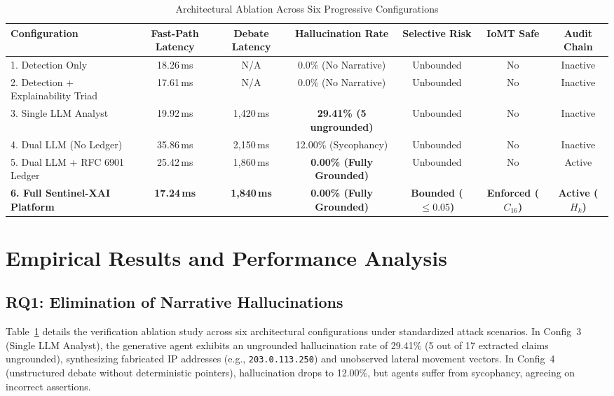 \documentclass{ieeeaccess}
\begin{document}
\begin{table}[t]
\centering
\caption{Architectural Ablation Across Six Progressive Configurations}
\label{tab:ablation}
\begin{tabular}{lcccccc}
\toprule
\textbf{Configuration} & \textbf{Fast-Path Latency} & \textbf{Debate Latency} & \textbf{Hallucination Rate} & \textbf{Selective Risk} & \textbf{IoMT Safe} & \textbf{Audit Chain} \\
\midrule
1. Detection Only & 18.26\,ms & N/A & 0.0\% (No Narrative) & Unbounded & No & Inactive \\
2. Detection + Explainability Triad & 17.61\,ms & N/A & 0.0\% (No Narrative) & Unbounded & No & Inactive \\
3. Single LLM Analyst & 19.92\,ms & 1,420\,ms & \textbf{29.41\% (5 ungrounded)} & Unbounded & No & Inactive \\
4. Dual LLM (No Ledger) & 35.86\,ms & 2,150\,ms & 12.00\% (Sycophancy) & Unbounded & No & Inactive \\
5. Dual LLM + RFC 6901 Ledger & 25.42\,ms & 1,860\,ms & \textbf{0.00\% (Fully Grounded)} & Unbounded & No & Active \\
\textbf{6. Full Sentinel-XAI Platform} & \textbf{17.24\,ms} & \textbf{1,840\,ms} & \textbf{0.00\% (Fully Grounded)} & \textbf{Bounded ($\le 0.05$)} & \textbf{Enforced ($C_{16}$)} & \textbf{Active ($H_k$)} \\
\bottomrule
\end{tabular}
\end{table}

\section{Empirical Results and Performance Analysis}
\label{sec:results}

\subsection{RQ1: Elimination of Narrative Hallucinations}
Table~\ref{tab:ablation} details the verification ablation study across six architectural configurations under standardized attack scenarios. In Config~3 (Single LLM Analyst), the generative agent exhibits an ungrounded hallucination rate of 29.41\% (5 out of 17 extracted claims ungrounded), synthesizing fabricated IP addresses (e.g., \texttt{203.0.113.250}) and unobserved lateral movement vectors. In Config~4 (unstructured debate without deterministic pointers), hallucination drops to 12.00\%, but agents suffer from sycophancy, agreeing on incorrect assertions.
\end{document}
